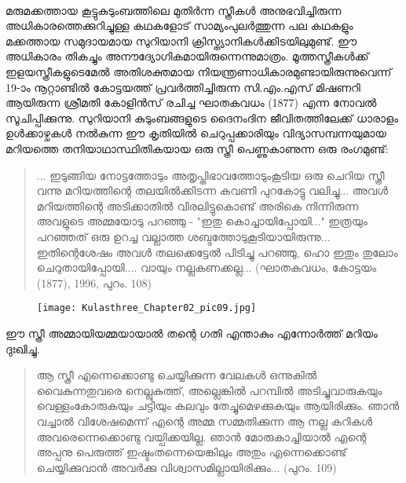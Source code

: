 \paragraph{}മരുമക്കത്തായ കൂട്ടുകുടുംബത്തിലെ മുതിർന്ന സ്ത്രീകൾ അനുഭവിച്ചിരുന്ന അധികാരത്തെക്കുറിച്ചുള്ള കഥകളോട് സാമ്യംപുലർത്തുന്ന പല കഥകളും മക്കത്തായ സമുദായമായ സുറിയാനി ക്രിസ്ത്യാനികൾക്കിടയിലുമുണ്ട്. ഈ അധികാരം തികച്ചും അനൗദ്യോഗികമായിരുന്നെന്നുമാത്രം. മൂത്തസ്ത്രീകൾക്ക് ഇളയസ്ത്രീകളുടെമേൽ അതിശക്തമായ നിയന്ത്രണാധികാരമുണ്ടായിരുന്നുവെന്ന് 19-ാം നൂറ്റാണ്ടിൽ കോട്ടയത്ത് പ്രവർത്തിച്ചിരുന്ന സി.എം.എസ് മിഷണറി ആയിരുന്ന ശ്രീമതി കോളിൻസ് രചിച്ച ഘാതകവധം (1877) എന്ന നോവൽ സൂചിപ്പിക്കുന്നു. സുറിയാനി കുടുംബങ്ങളുടെ ദൈനംദിന ജീവിതത്തിലേക്ക് ധാരാളം ഉൾക്കാഴ്ചകൾ നൽകുന്ന ഈ കൃതിയിൽ ചെറുപ്പക്കാരിയും വിദ്യാസമ്പന്നയുമായ മറിയത്തെ തനിയാഥാസ്ഥിതികയായ ഒരു സ്ത്രീ പെണ്ണുകാണുന്ന ഒരു രംഗമുണ്ട്:
\begin{quotation}
... ഇടുങ്ങിയ നോട്ടത്തോടും അതൃപ്തിഭാവത്തോടുംകൂടിയ ഒരു ചെറിയ സ്ത്രീ വന്നു മറിയത്തിന്റെ തലയിൽക്കിടന്ന കവണി പുറകോട്ടു വലിച്ചു... അവൾ മറിയത്തിന്റെ അടിക്കാതിൽ വിരലിട്ടുകൊണ്ട് അരികെ നിന്നിരുന്ന അവളുടെ അമ്മയോടു പറഞ്ഞു - "ഇതു കൊച്ചായിപ്പോയി..." ഇത്രയും പറഞ്ഞത് ഒരു ഉറച്ച വല്ലാത്ത ശബ്ദത്തോടുകൂടിയായിരുന്നു... ഇതിന്റെശേഷം അവൾ തലക്കെട്ടേൽ പിടിച്ചു പറഞ്ഞു, ഹൊ ഇതും തുലോം ചെറുതായിപ്പോയി.... വായും നല്ലകണക്കല്ല...
(ഘാതകവധം, കോട്ടയം (1877), 1996, പുറം. 108)
\end{quotation}
\begin{figure}[h]
\begin{center}
\texttt{[image: Kulasthree\_Chapter02\_pic09.jpg]}
\end{center}
\end{figure}


ഈ സ്ത്രീ അമ്മായിയമ്മയായാൽ തന്റെ ഗതി എന്താകും എന്നോർത്ത് മറിയം ദുഃഖിച്ചു.
\begin{quotation}
ആ സ്ത്രീ എന്നെക്കൊണ്ടു ചെയ്യിക്കുന്ന വേലകൾ ഒന്നുകിൽ വൈകുന്നതുവരെ നെല്ലുകുത്ത്, അല്ലെങ്കിൽ പറമ്പിൽ അടിച്ചുവാരുകയും വെള്ളംകോരുകയും ചട്ടിയും കലവും തേച്ചുമെഴക്കുകയും ആയിരിക്കും. ഞാൻ വച്ചാൽ വിശേഷമെന്ന് എന്റെ അമ്മ സമ്മതിക്കുന്ന ആ നല്ല കറികൾ അവരെന്നെക്കൊണ്ടു വയ്പിക്കയില്ല. ഞാൻ മോരുകാച്ചിയാൽ എന്റെ അപ്പനു പെരുത്ത് ഇഷ്ടംതന്നെയെങ്കിലും അതും എന്നെക്കൊണ്ട് ചെയ്യിക്കുവാൻ അവർക്കു വിശ്വാസമില്ലായിരിക്കും... (പുറം. 109)
\end{quotation}

